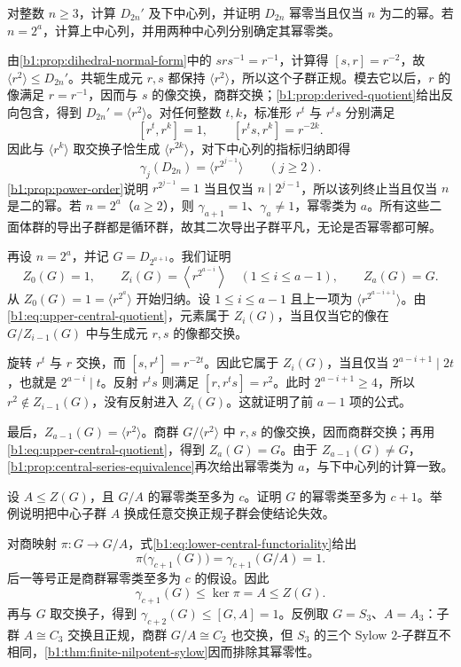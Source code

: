\begin{exercise}\label{b1:ex:07-dihedral-series}
	对整数 \(n\ge3\)，计算 \(D_{2n}'\) 及下中心列，并证明 \(D_{2n}\) 幂零当且仅当 \(n\) 为二的幂。若 \(n=2^a\)，计算上中心列，并用两种中心列分别确定其幂零类。
\end{exercise}
\begin{solution}
	由\cref{b1:prop:dihedral-normal-form}中的 \(srs^{-1}=r^{-1}\)，计算得 \([s,r]=r^{-2}\)，故 \(\langle r^2\rangle\le D_{2n}'\)。共轭生成元 \(r,s\) 都保持 \(\langle r^2\rangle\)，所以这个子群正规。模去它以后，\(r\) 的像满足 \(r=r^{-1}\)，因而与 \(s\) 的像交换，商群交换；\cref{b1:prop:derived-quotient}给出反向包含，得到 \(D_{2n}'=\langle r^2\rangle\)。对任何整数 \(t,k\)，标准形 \(r^t\) 与 \(r^ts\) 分别满足
	\[
		[r^t,r^k]=1,\qquad [r^ts,r^k]=r^{-2k}.
	\]
	因此与 \(\langle r^k\rangle\) 取交换子恰生成 \(\langle r^{2k}\rangle\)，对下中心列的指标归纳即得
	\[
		\gamma_j(D_{2n})=\langle r^{2^{j-1}}\rangle\qquad(j\ge2).
	\]
	\cref{b1:prop:power-order}说明 \(r^{2^{j-1}}=1\) 当且仅当 \(n\mid2^{j-1}\)，所以该列终止当且仅当 \(n\) 是二的幂。若 \(n=2^a\)（\(a\ge2\)），则 \(\gamma_{a+1}=1\)、\(\gamma_a\ne1\)，幂零类为 \(a\)。所有这些二面体群的导出子群都是循环群，故其二次导出子群平凡，无论是否幂零都可解。

	再设 \(n=2^a\)，并记 \(G=D_{2^{a+1}}\)。我们证明
	\[
		Z_0(G)=1,\qquad Z_i(G)=\left\langle r^{2^{a-i}}\right\rangle\quad(1\le i\le a-1), \qquad Z_a(G)=G.
	\]
	从 \(Z_0(G)=1=\langle r^{2^a}\rangle\) 开始归纳。设 \(1\le i\le a-1\) 且上一项为 \(\langle r^{2^{a-i+1}}\rangle\)。由\eqref{b1:eq:upper-central-quotient}，元素属于 \(Z_i(G)\)，当且仅当它的像在 \(G/Z_{i-1}(G)\) 中与生成元 \(r,s\) 的像都交换。

	旋转 \(r^t\) 与 \(r\) 交换，而 \([s,r^t]=r^{-2t}\)。因此它属于 \(Z_i(G)\)，当且仅当 \(2^{a-i+1}\mid2t\)，也就是 \(2^{a-i}\mid t\)。反射 \(r^ts\) 则满足 \([r,r^ts]=r^2\)。此时 \(2^{a-i+1}\ge4\)，所以 \(r^2\notin Z_{i-1}(G)\)，没有反射进入 \(Z_i(G)\)。这就证明了前 \(a-1\) 项的公式。

	最后，\(Z_{a-1}(G)=\langle r^2\rangle\)。商群 \(G/\langle r^2\rangle\) 中 \(r,s\) 的像交换，因而商群交换；再用\eqref{b1:eq:upper-central-quotient}，得到 \(Z_a(G)=G\)。由于 \(Z_{a-1}(G)\neq G\)，\cref{b1:prop:central-series-equivalence}再次给出幂零类为 \(a\)，与下中心列的计算一致。
\end{solution}

\begin{exercise}\label{b1:ex:07-central-extension}
	设 \(A\leq Z(G)\)，且 \(G/A\) 的幂零类至多为 \(c\)。证明 \(G\) 的幂零类至多为 \(c+1\)。举例说明把中心子群 \(A\) 换成任意交换正规子群会使结论失效。
\end{exercise}
\begin{solution}
	对商映射 \(\pi:G\to G/A\)，式\eqref{b1:eq:lower-central-functoriality}给出
	\[
		\pi\bigl(\gamma_{c+1}(G)\bigr) =\gamma_{c+1}(G/A)=1.
	\]
	后一等号正是商群幂零类至多为 \(c\) 的假设。因此
	\[
		\gamma_{c+1}(G)\leq\ker\pi=A\leq Z(G).
	\]
	再与 \(G\) 取交换子，得到 \(\gamma_{c+2}(G)\leq[G,A]=1\)。反例取 \(G=S_3\)、\(A=A_3\)：子群 \(A\cong C_3\) 交换且正规，商群 \(G/A\cong C_2\) 也交换，但 \(S_3\) 的三个 Sylow \(2\)-子群互不相同，\cref{b1:thm:finite-nilpotent-sylow}因而排除其幂零性。
\end{solution}

